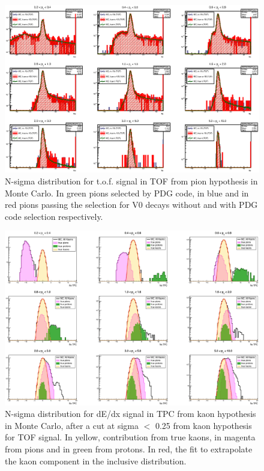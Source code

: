 \begin{figure}[!h]
 \centering
 \includegraphics[angle=0, width=13cm]{./FigCap5/MCPionTOF_AllTrueSig.eps}
 \caption{N-sigma distribution for t.o.f. signal in TOF from pion hypothesis in Monte Carlo. In green pions selected by PDG code, in blue and in red pions passing the selection for V0 decays without and with PDG code selection respectively.}
 \label{fig:MCPionsTOF} 
\end{figure}

\begin{figure}[!h]
 \centering
 \includegraphics[angle=0, width=13cm]{./FigCap5/MCKaonComponents.eps}
 \caption{N-sigma distribution for dE/dx signal in TPC from kaon hypothesis in Monte Carlo, after a cut at sigma $<$ 0.25 from kaon hypothesis for TOF signal. In yellow, contribution from true kaons, in magenta from pions and in green from protons. In red, the fit to extrapolate the kaon component in the inclusive distribution.}
 \label{fig:DataPionsTOF} 
\end{figure}

